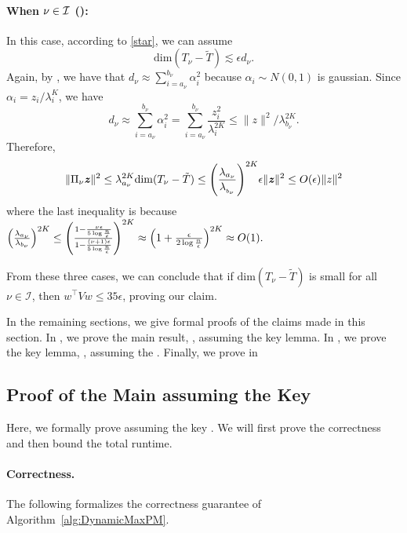 \documentclass[11pt]{article}
\let\originalleft\left
\let\originalright\right
\renewcommand{\left}{\mathopen{}\mathclose\bgroup\originalleft}
\renewcommand{\right}{\aftergroup\egroup\originalright}
\def\dim#1{\mathrm{dim} (#1)}
\newcommand\ww{\boldsymbol{\mathit{w}}}
\newcommand\zz{\boldsymbol{\mathit{z}}}
\newcommand\VV{\boldsymbol{\mathit{V}}}
\begin{document}
\begin{enumerate}
\paragraph{When $\nu\in{\cal I}$ ():}

In this case, according to \eqref{star}, we can assume $$\dim{T_{\nu}-\tilde{T}}\lesssim\epsilon d_{\nu}.$$
Again, by , we have that $d_{\nu}\approx\sum_{i=a_{\nu}}^{b_{\nu}}\alpha_{i}^{2}$ because $\alpha_{i}\sim N(0,1)$ is gaussian. Since $\alpha_{i}=z_{i}/\lambda_{i}^{K}$, we have
\[
d_{\nu}\approx\sum_{i=a_{\nu}}^{b_{\nu}}\alpha_{i}^{2}=\sum_{i=a_{\nu}}^{b_{\nu}}\frac{z_{i}^{2}}{\lambda_{i}^{2K}}\le\|\zz\|^{2}/\lambda_{b_{\nu}}^{2K}.
\]
Therefore,
\[
\|\Pi_{\nu}\zz\|^2\le\lambda_{a_{\nu}}^{2K}\dim{T_{\nu}-\tilde{T}}\le\left(\frac{\lambda_{a_{\nu}}}{\lambda_{_{b_{\nu}}}}\right)^{2K}\epsilon\|\zz\|^{2}\le O(\epsilon)\|z\|^{2}
\]
where the last inequality is because $\ensuremath{\left(\frac{\lambda_{a_{\nu}}}{\lambda_{b_{\nu}}}\right)^{2K}\leq\left(\frac{1-\frac{\nu\epsilon}{5\log\frac{n}{\epsilon}}}{1-\frac{(\nu+1)\epsilon}{5\log\frac{n}{\epsilon}}}\right)^{2K}\approx\left(1+\frac{\epsilon}{2\log\frac{n}{\epsilon}}\right)^{2K}\approx O(1)}.$

\end{enumerate}
From these three cases, we can conclude that if $\dim{T_{\nu}-\tilde{T}}$ is small for all $\nu\in \mathcal{I}$, then $\ww^{\top}\VV\ww \leq 35\epsilon$, proving our claim.

In the remaining sections, 
we give formal proofs of the claims made in this section. In , we prove the main result, , assuming the key lemma. In , we prove the key lemma, , assuming the . Finally, we prove  in 


\subsection{Proof of the Main  assuming the Key }\label{sec:correct}

Here, we formally prove  assuming the key . We will first prove the correctness and then bound the total runtime.


\paragraph{Correctness.}
The following formalizes the correctness guarantee of  Algorithm~\ref{alg:DynamicMaxPM}. 
\end{document}
